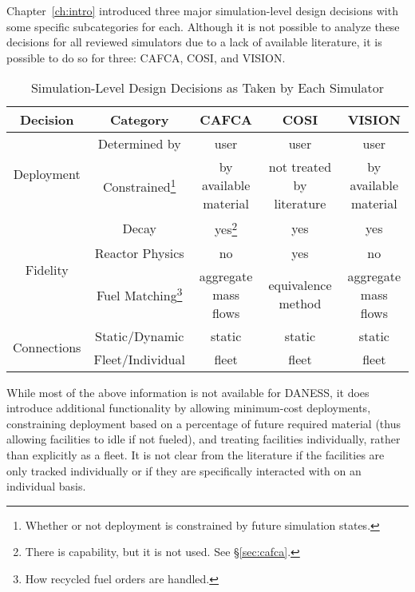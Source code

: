 Chapter~\ref{ch:intro} introduced three major simulation-level design decisions
with some specific subcategories for each. Although it is not possible to
analyze these decisions for all reviewed simulators due to a lack of available
literature, it is possible to do so for three: CAFCA, COSI, and VISION. 

\begin{savenotes}
\begin{table} [h!]
\centering
\begin{tabular} {|c|c|c|c|c|} 
\hline
Decision                     & Category & CAFCA & COSI & VISION \\ 
\hline
\multirow{2}{*}{Deployment}  & Determined by 
                             & user & user & user \\ \cline{2-5}
                             & Constrained\footnote{Whether or not deployment is constrained by future simulation states.}   
                             & by available material & not treated by literature & by available material \\ \hline
\multirow{3}{*}{Fidelity}    & Decay 
                             & yes\footnote{There is capability, but it is not used. See \S\ref{sec:cafca}.} & yes & yes \\ \cline{2-5}
                             & Reactor Physics 
                             & no & yes & no \\ \cline{2-5}
                             & Fuel Matching\footnote{How recycled fuel orders are handled.} 
                             & aggregate mass flows & equivalence method & aggregate mass flows \\ \hline
\multirow{2}{*}{Connections} & Static/Dynamic 
                             & static & static & static \\ \cline{2-5}
                             & Fleet/Individual 
                             & fleet & fleet & fleet \\
\hline
\end{tabular}
\caption{Simulation-Level Design Decisions as Taken by Each Simulator}
\label{tab:sim-summary}
\end{table}
\end{savenotes}

While most of the above information is not available for DANESS, it does
introduce additional functionality by allowing minimum-cost deployments,
constraining deployment based on a percentage of future required material (thus
allowing facilities to idle if not fueled), and treating facilities
individually, rather than explicitly as a fleet. It is not clear from the
literature if the facilities are only tracked individually or if they are
specifically interacted with on an individual basis.

